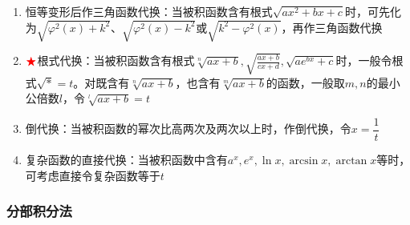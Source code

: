 \documentclass[../book.tex]{subfiles}
\begin{document}
\begin{enumerate}
\begin{itemize}
\begin{center}
\begin{tikzpicture}[scale=0.8]
                \end{tikzpicture}
            \end{center}
            \item $\sqrt {x^2 - a^2} \Rightarrow$ 令$x = a\sec t$
            \[
                \begin{cases}
                    x > 0 \;\Longrightarrow\; 0 < t < \dfrac{\pi}{2}, \\[6pt]
                    x < 0 \;\Longrightarrow\; \dfrac{\pi}{2} < t < \pi.
                \end{cases}
            \]
        \end{itemize}
        \item 恒等变形后作三角函数代换：当被积函数含有根式$\sqrt {ax^2 + bx + c}$时，可先化为$\sqrt {\varphi^2(x) + k^2}$、$\sqrt {\varphi^2(x) - k^2}$或$\sqrt {k^2 - \varphi^2(x)}$，再作三角函数代换
        \item ${\color{red}{\bigstar}}$根式代换：当被积函数含有根式$\sqrt[n]{ax + b}, \sqrt {\displaystyle\frac{ax + b}{cx + d}}, \sqrt {ae^{bx} + c}$时，一般令根式$\sqrt {*} = t$。对既含有$\sqrt[n]{ax + b}$，也含有$\sqrt[m]{ax + b}$的函数，一般取$m, n$的最小公倍数$l$，令$\sqrt[l]{ax + b} = t$
        \item 倒代换：当被积函数{\color{red}{分母}}的幂次比{\color{red}{分子}}高两次及两次以上时，作倒代换，令$x = \dfrac{1}{t}$
        \item 复杂函数的直接代换：当被积函数中含有$a^x, e^x, \ln x, \arcsin x, \arctan x$等时，可考虑直接令复杂函数等于$t$
    \end{enumerate}

    \subsubsection{分部积分法}
\end{document}
